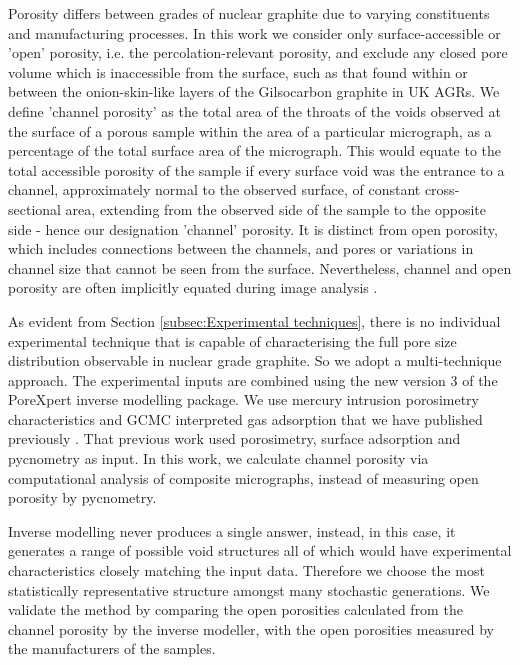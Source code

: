 \documentclass[review]{elsarticle}
\begin{document}
Porosity differs between grades of nuclear graphite due to varying constituents
and manufacturing processes. In this work we consider only surface-accessible or
'open' porosity, i.e. the percolation-relevant porosity, and exclude any closed
pore volume which is inaccessible from the surface, such as that found within or
between the onion-skin-like layers of the Gilsocarbon graphite in UK AGRs. We
define 'channel porosity' as the total area of the throats of the voids observed
at the surface of a porous sample within the area of a particular micrograph, as
a percentage of the total surface area of the micrograph. This would equate  to
the total accessible porosity of the sample if every surface void was the
entrance to a channel, approximately normal to the observed surface, of constant
cross-sectional area, extending from the observed side of the sample to the
opposite side - hence our designation 'channel' porosity.  It is distinct from
open porosity, which includes  connections between the channels, and pores
or variations in channel size that cannot be seen from the surface.    
Nevertheless, channel and open porosity are often implicitly equated during image
analysis \citep{Kane2011a,Huang2019,huang2021statistical}.

As evident from Section \ref{subsec:Experimental techniques}, there is no
individual experimental technique that is capable of characterising the full
pore size distribution observable in nuclear grade graphite.  So we adopt a
multi-technique approach.  The experimental inputs are combined using the new version 3 of the 
PoreXpert inverse modelling package.  We use mercury intrusion porosimetry
characteristics and GCMC interpreted gas adsorption that we have published
previously \citep{Jones2018}. That previous work used porosimetry, surface
adsorption and pycnometry as input.  In this work, we calculate channel porosity
via computational analysis of composite micrographs, instead of measuring open
porosity by pycnometry. 

Inverse modelling never produces a single answer, instead, in this case, it
generates a range of possible void structures all of which would have
experimental characteristics closely matching the input data. Therefore we
choose the most statistically representative structure amongst many stochastic
generations.  We validate the method by comparing the open porosities
calculated from the channel porosity by the inverse modeller, with the open
porosities measured by the manufacturers of the samples. 
\end{document}
